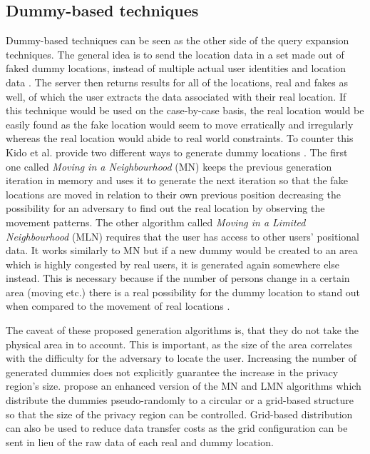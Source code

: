 \documentclass[english]{tktltiki2}
\theoremstyle{definition}
\theoremstyle{remark}
\begin{document}
\subsection{Dummy-based techniques}

Dummy-based techniques can be seen as the other side of the query expansion techniques. The general idea is to send the location data in a set made out of faked dummy locations, instead of multiple actual user identities and location data \cite{Kido2005}. The server then returns results for all of the locations, real and fakes as well, of which the user extracts the data associated with their real location. If this technique would be used on the case-by-case basis, the real location would be easily found as the fake location would seem to move erratically and irregularly whereas the real location would abide to real world constraints. To counter this Kido et al. provide two different ways to generate dummy locations \cite{Kido2005}. The first one called \textit{Moving in a Neighbourhood} (MN) keeps the previous generation iteration in memory and uses it to generate the next iteration so that the fake locations are moved in relation to their own previous position decreasing the possibility for an adversary to find out the real location by observing the movement patterns. The other algorithm called \textit{Moving in a Limited Neighbourhood} (MLN) requires that the user has access to other users' positional data. It works similarly to MN but if a new dummy would be created to an area which is highly congested by real users, it is generated again somewhere else instead. This is necessary because if the number of persons change in a certain area (moving etc.) there is a real possibility for the dummy location to stand out when compared to the movement of real locations \cite{Kido2005}. \par
The caveat of these proposed generation algorithms is, that they do not take the physical area in to account. This is important, as the size of the area correlates with the difficulty for the adversary to locate  the user. Increasing the number of generated dummies does not explicitly guarantee the increase in the privacy region's size. \cite{Lu2008} propose an enhanced version of the MN and LMN algorithms which distribute the dummies pseudo-randomly to a circular or a grid-based structure so that the size of the privacy region can be controlled. Grid-based distribution can also be used to reduce data transfer costs as the grid configuration can be sent in lieu of the raw data of each real and dummy location.
\end{document}
